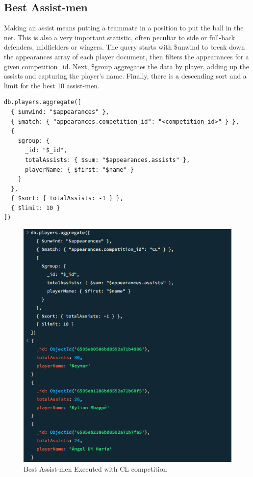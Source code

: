 \documentclass{Configuration_Files/PoliMi3i_thesis}
\begin{document}
\subsection{Best Assist-men}
Making an assist means putting a teammate in a position to put the ball in the net. This is also a very important statistic, often peculiar to side or full-back defenders, midfielders or wingers. The query starts with \$unwind to break down the appearances array of each player document, then filters the appearances for a given competition\_id. Next, \$group aggregates the data by player, adding up the assists and capturing the player's name. Finally, there is a descending sort and a limit for the best 10 assist-men.

\begin{verbatim}
db.players.aggregate([
  { $unwind: "$appearances" },
  { $match: { "appearances.competition_id": "<competition_id>" } },
  { 
    $group: {
      _id: "$_id",
      totalAssists: { $sum: "$appearances.assists" },
      playerName: { $first: "$name" }  
    }
  },
  { $sort: { totalAssists: -1 } },
  { $limit: 10 }
])

\end{verbatim}
\begin{figure}[htbp]
    \centering
    \includegraphics[scale=0.6]{Images/Queries/Competitions_statistics/best-assistmen/CL.png}
    \caption{Best Assist-men Executed with CL competition}
\end{figure}
\newpage
\end{document}
